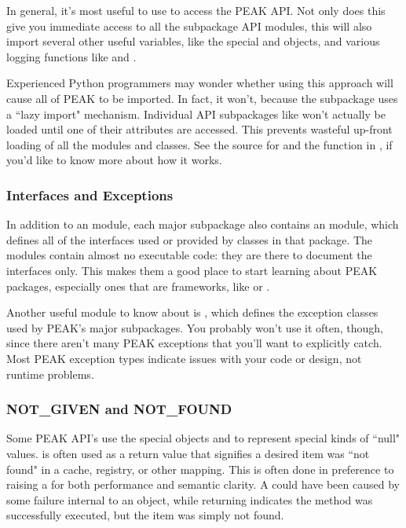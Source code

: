In general, it's most useful to use  to access
the PEAK API.  Not only does this give you immediate access to all the
subpackage API modules, this will also import several other useful variables,
like the special  and  objects, and various
logging functions like  and .

Experienced Python programmers may wonder whether using this approach
will cause all of PEAK to be imported.  In fact, it won't, because the
 subpackage uses a ``lazy import" mechanism.  Individual API
subpackages like  won't actually be loaded until one of
their attributes are accessed.  This prevents wasteful up-front loading of all
the modules and classes.  See the source for  and
the  function in , if you'd like
to know more about how it works.





\subsubsection{Interfaces and Exceptions}

In addition to an  module, each major subpackage also contains an
 module, which defines all of the interfaces used or provided
by classes in that package.  The  modules contain almost no
executable code: they are there to document the interfaces only.  This makes
them a good place to start learning about PEAK packages, especially ones that
are frameworks, like  or .

Another useful module to know about is , which defines
the exception classes used by PEAK's major subpackages.  You probably won't use
it often, though, since there aren't many PEAK exceptions that you'll want to
explicitly catch.  Most PEAK exception types indicate issues with your code or
design, not runtime problems.

\subsubsection{NOT_GIVEN and NOT_FOUND}

Some PEAK API's use the special objects  and 
to represent special kinds of ``null" values.   is often
used as a return value that signifies a desired item was ``not found" in a
cache, registry, or other mapping.  This is often done in preference to
raising a  for both performance and semantic clarity.  A
 could have been caused by some failure internal to an
object, while returning  indicates the method was successfully
executed, but the item was simply not found.

